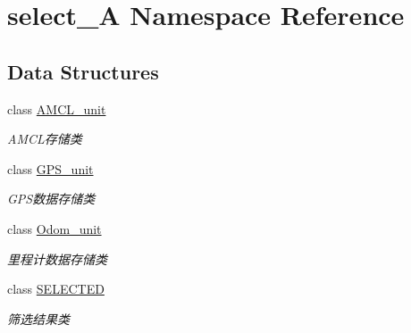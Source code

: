 \hypertarget{namespaceselect___a}{}\section{select\+\_\+A Namespace Reference}
\label{namespaceselect___a}
\subsection*{Data Structures}
\begin{DoxyCompactItemize}
\item 
class \hyperlink{classselect___a_1_1_a_m_c_l__unit}{A\+M\+C\+L\+\_\+unit}
\begin{DoxyCompactList}\small\item\em A\+M\+C\+L存储类 \end{DoxyCompactList}\item 
class \hyperlink{classselect___a_1_1_g_p_s__unit}{G\+P\+S\+\_\+unit}
\begin{DoxyCompactList}\small\item\em G\+P\+S数据存储类 \end{DoxyCompactList}\item 
class \hyperlink{classselect___a_1_1_odom__unit}{Odom\+\_\+unit}
\begin{DoxyCompactList}\small\item\em 里程计数据存储类 \end{DoxyCompactList}\item 
class \hyperlink{classselect___a_1_1_s_e_l_e_c_t_e_d}{S\+E\+L\+E\+C\+T\+ED}
\begin{DoxyCompactList}\small\item\em 筛选结果类 \end{DoxyCompactList}\end{DoxyCompactItemize}
